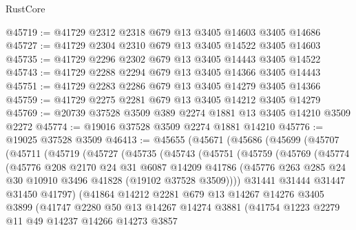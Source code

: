 \begin{lexlean}{RustCore}
\begin{coremodule}
@45719 := @41729 @2312 @2318 @679 @13 @3405 @14603 @3405 @14686
@45727 := @41729 @2304 @2310 @679 @13 @3405 @14522 @3405 @14603
@45735 := @41729 @2296 @2302 @679 @13 @3405 @14443 @3405 @14522
@45743 := @41729 @2288 @2294 @679 @13 @3405 @14366 @3405 @14443
@45751 := @41729 @2283 @2286 @679 @13 @3405 @14279 @3405 @14366
@45759 := @41729 @2275 @2281 @679 @13 @3405 @14212 @3405 @14279
@45769 := @20739 @37528 @3509 @389 @2274 @1881 @13 @3405 @14210 @3509 @2272
@45774 := @19016 @37528 @3509 @2274 @1881 @14210
@45776 := @19025 @37528 @3509
@46413 := @45655
    (@45671
      (@45686
        (@45699
          (@45707
            (@45711
              (@45719
                (@45727
                  (@45735
                    (@45743
                      (@45751
                        (@45759
                          (@45769
                            (@45774
                              (@45776
                                @208
                                @2170
                                @24
                                @31
                                @6087
                                @14209
                                @41786
                                (@45776
                                  @263
                                  @285
                                  @24
                                  @30
                                  @10910
                                  @3496
                                  @41828
                                  (@19102 @37528 @3509))))
                            @31441
                            @31444
                            @31447
                            @31450
                            @41797)
                          (@41864
                            @14212
                            @2281
                            @679
                            @13
                            @14267
                            @14276
                            @3405
                            @3899
                            (@41747
                              @2280
                              @50
                              @13
                              @14267
                              @14274
                              @3881
                              (@41754
                                @1223
                                @2279
                                @11
                                @49
                                @14237
                                @14266
                                @14273
                                @3857

\end{coremodule}
\end{lexlean}
